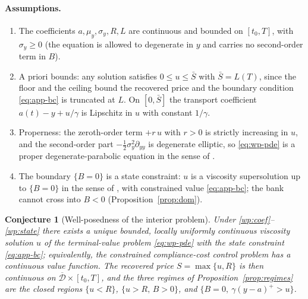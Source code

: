 \documentclass[11pt,letterpaper]{article}
\theoremstyle{plain}
\newtheorem{conjecture}[theorem]{Conjecture}
\theoremstyle{definition}
\numberwithin{equation}{section}
\begin{document}
\paragraph{Assumptions.}
\begin{enumerate}[label=(W\arabic*),leftmargin=3.2em]
  \item\label{wp:coef} The coefficients $a,\mu_y,\sigma_y,R,L$ are continuous and bounded on
    $[t_0,T]$, with $\sigma_y\ge 0$ (the equation is allowed to degenerate in $y$ and carries no
    second-order term in $B$).
  \item\label{wp:bound} A priori bounds: any solution satisfies
    $0\le u\le \bar S$ with $\bar S = L(T)$, since the floor and the ceiling bound the recovered
    price and the boundary condition \eqref{eq:app-bc} is truncated at $L$. On $[0,\bar S]$ the
    transport coefficient $a(t)-y+u/\gamma$ is Lipschitz in $u$ with constant $1/\gamma$.
  \item\label{wp:proper} Properness: the zeroth-order term $+r\,u$ with $r>0$ is strictly
    increasing in $u$, and the second-order part $-\tfrac12\sigma_y^2\partial_{yy}$ is degenerate
    elliptic, so \eqref{eq:wp-pde} is a proper degenerate-parabolic equation in the sense of
    \citet{crandall1992}.
  \item\label{wp:state} The boundary $\{B=0\}$ is a state constraint: $u$ is a viscosity
    supersolution up to $\{B=0\}$ in the sense of \citet{soner1986}, with constrained value
    \eqref{eq:app-bc}; the bank cannot cross into $B<0$ (Proposition~\ref{prop:dom}).
\end{enumerate}

\begin{conjecture}[Well-posedness of the interior problem]\label{conj:wp}
Under \ref{wp:coef}--\ref{wp:state} there exists a unique bounded, locally uniformly continuous viscosity solution $u$ of the terminal-value problem \eqref{eq:wp-pde} with the state constraint \eqref{eq:app-bc}; equivalently, the constrained compliance-cost control problem has a continuous value function. The recovered price $S=\max\{u,R\}$ is then continuous on
$\overline{\mathcal{D}}\times[t_0,T]$, and the three regimes of Proposition~\ref{prop:regimes} are the closed regions $\{u<R\}$, $\{u>R,\,B>0\}$, and $\{B=0,\ \gamma(y-a)^+>u\}$.
\end{conjecture}
\end{document}
